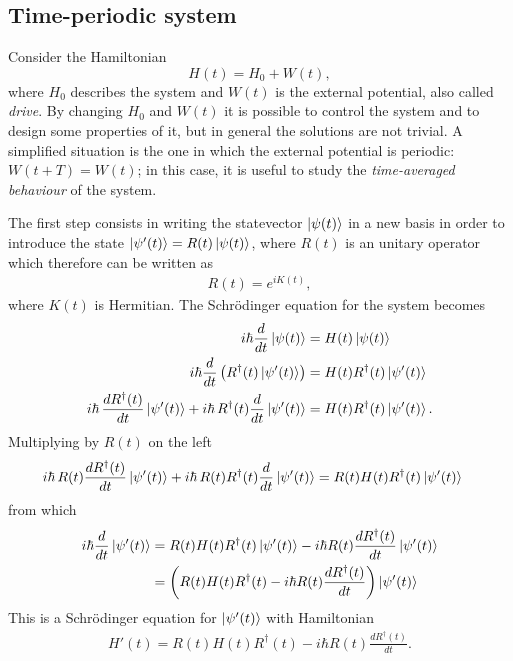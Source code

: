 \subsection{Time-periodic system}
\label{subsec:1.5.2}
Consider the Hamiltonian 
\begin{equation}
    H(t) = H_0 + W(t),
\end{equation}
where $H_0$ describes the system and $W(t)$ is the external potential, also called \textit{drive}. By changing $H_0$ and $W(t)$ it is possible to control the system and to design some properties of it, but in general the solutions are not trivial. A simplified situation is the one in which the external potential is periodic: $W(t+T) = W(t)$; in this case, it is useful to study the \textit{time-averaged behaviour} of the system. 

The first step consists in writing the statevector $\ket{\psi(t)}$ in a new basis in order to introduce the state $\ket{\psi'(t)} = R(t) \ket{\psi(t)}$, where $R(t)$ is an unitary operator which therefore can be written as 
\begin{align*}
    R(t) = e^{i K(t)},
\end{align*}
where $K(t)$ is Hermitian. The Schr\"odinger equation for the system becomes 
\begin{align*}
    i \hbar \frac{d}{dt} \ket{\psi(t)} &= H(t)  \ket{\psi(t)} \\
    i \hbar \frac{d}{dt} \left( R^\dagger(t) \ket{\psi'(t)} \right) &= H(t) R^\dagger(t) \ket{\psi'(t)} \\
    i \hbar \, \frac{dR^\dagger(t)}{dt} \ket{\psi'(t)} + i \hbar \, R^\dagger(t) \frac{d}{dt} \ket{\psi'(t)} &= H(t) R^\dagger(t) \ket{\psi'(t)}.
\end{align*}
Multiplying by $R(t)$ on the left
\begin{align*}
    i \hbar \, R(t) \frac{dR^\dagger(t)}{dt} \ket{\psi'(t)} + i \hbar \,R(t) R^\dagger(t) \frac{d}{dt} \ket{\psi'(t)} &= R(t) H(t) R^\dagger(t) \ket{\psi'(t)}
\end{align*}
from which 
\begin{align*}
    i \hbar \frac{d}{dt} \ket{\psi'(t)} &= R(t) H(t) R^\dagger(t) \ket{\psi'(t)} - i \hbar R(t) \frac{dR^\dagger(t)}{dt} \ket{\psi'(t)} \\
    &= \left( R(t) H(t) R^\dagger(t) - i \hbar R(t) \frac{dR^\dagger(t)}{dt} \right) \ket{\psi'(t)}
\end{align*}
This is a Schr\"odinger equation for $\ket{\psi'(t)}$ with Hamiltonian 
\begin{align}
    H'(t) = R(t) H(t) R^\dagger(t) - i \hbar R(t) \frac{dR^\dagger(t)}{dt}. 
    \label{eq:transfH}
\end{align}
